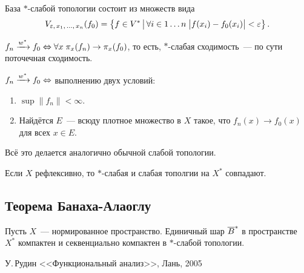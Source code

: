 \documentclass{notes}
\newcommand{\ta}{$*$}
\newcommand{\sweak}{\xrightarrow{w^{*}}}
\begin{document}
	\begin{st}
		База \ta-слабой топологии состоит из множеств вида
		\[
			V_{\varepsilon, \, x_1, \, \ldots, \, x_n}(f_0) = \left\{f \in V^{*} \, \big | \, \forall i \in 1\ldots n \; \big|f(x_i) - f_0(x_i)\big| < \varepsilon \right\}.
		\]
	\end{st}

	\begin{st}
		$f_n \sweak f_0 \eqv \all x \; \pi_x(f_n) \to \pi_x(f_0)$, то есть, \ta-слабая сходимость~--- по сути поточечная сходимость.
	\end{st}

	\begin{thm}
		$f_n \sweak f_0 \eqv$ выполнению двух условий:
		\begin{enumerate}
			\item $\sup \|f_n\| < \infty$.
			\item Найдётся $E$~--- всюду плотное множество в $X$ такое, что $f_n(x) \to f_0(x)$ для всех $x \in E$.
		\end{enumerate}
	\end{thm}

	Всё это делается аналогично обычной слабой топологии.

	\begin{exm}
		Если $X$ рефлексивно, то \ta-слабая и слабая тополгии на $X^{*}$ совпадают. 
	\end{exm}

\subsection{Теорема Банаха-Алаоглу}

	\begin{thm}
		Пусть $X$~--- нормированное пространство. Единичный шар $\overline{B}^*$ в пространстве $X^*$ компактен и секвенциально компактен в \ta-слабой топологии. 
	\end{thm}
\begin{thebibliography}{}

 У.$\,$Рудин <<Функциональный анализ>>, Лань, 2005

\end{thebibliography}{}
\end{document}
